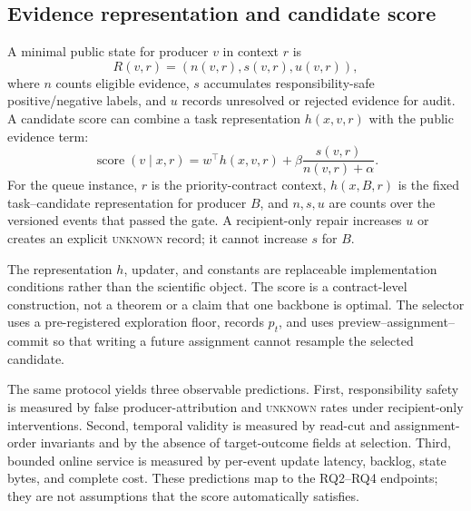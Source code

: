 \documentclass[sigconf,anonymous]{aamas}
\newcommand{\unknown}{\textsc{unknown}}
\begin{document}
\subsection{Evidence representation and candidate score}
A minimal public state for producer $v$ in context $r$ is
\begin{equation}
 R(v,r)=(n(v,r),s(v,r),u(v,r)),
 \label{eq:state}
\end{equation}
where $n$ counts eligible evidence, $s$ accumulates responsibility-safe positive/negative labels, and $u$ records unresolved or rejected evidence for audit. A candidate score can combine a task representation $h(x,v,r)$ with the public evidence term:
\begin{equation}
 \operatorname{score}(v\mid x,r)=w^\top h(x,v,r)+\beta\frac{s(v,r)}{n(v,r)+\alpha}.
 \label{eq:score}
\end{equation}
For the queue instance, $r$ is the priority-contract context, $h(x,B,r)$ is the fixed task--candidate representation for producer $B$, and $n,s,u$ are counts over the versioned events that passed the gate. A recipient-only repair increases $u$ or creates an explicit \unknown{} record; it cannot increase $s$ for $B$.

The representation $h$, updater, and constants are replaceable implementation conditions rather than the scientific object. The score is a contract-level construction, not a theorem or a claim that one backbone is optimal. The selector uses a pre-registered exploration floor, records $p_t$, and uses preview--assignment--commit so that writing a future assignment cannot resample the selected candidate.

The same protocol yields three observable predictions. First, responsibility safety is measured by false producer-attribution and \unknown{} rates under recipient-only interventions. Second, temporal validity is measured by read-cut and assignment-order invariants and by the absence of target-outcome fields at selection. Third, bounded online service is measured by per-event update latency, backlog, state bytes, and complete cost. These predictions map to the RQ2--RQ4 endpoints; they are not assumptions that the score automatically satisfies.
\end{document}

